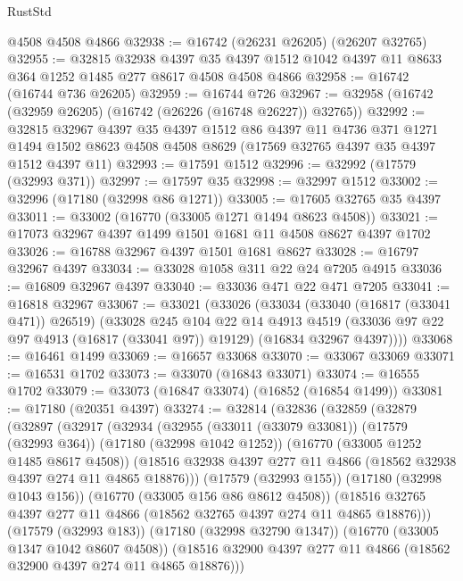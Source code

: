 \begin{lexlean}{RustStd}
\begin{coremodule}
    @4508
    @4508
    @4866
@32938 := @16742 (@26231 @26205) (@26207 @32765)
@32955 := @32815
    @32938
    @4397
    @35
    @4397
    @1512
    @1042
    @4397
    @11
    @8633
    @364
    @1252
    @1485
    @277
    @8617
    @4508
    @4508
    @4866
@32958 := @16742 (@16744 @736 @26205)
@32959 := @16744 @726
@32967 := @32958 (@16742 (@32959 @26205) (@16742 (@26226 (@16748 @26227)) @32765))
@32992 := @32815
    @32967
    @4397
    @35
    @4397
    @1512
    @86
    @4397
    @11
    @4736
    @371
    @1271
    @1494
    @1502
    @8623
    @4508
    @4508
    @8629
    (@17569 @32765 @4397 @35 @4397 @1512 @4397 @11)
@32993 := @17591 @1512
@32996 := @32992 (@17579 (@32993 @371))
@32997 := @17597 @35
@32998 := @32997 @1512
@33002 := @32996 (@17180 (@32998 @86 @1271))
@33005 := @17605 @32765 @35 @4397
@33011 := @33002 (@16770 (@33005 @1271 @1494 @8623 @4508))
@33021 := @17073 @32967 @4397 @1499 @1501 @1681 @11 @4508 @8627 @4397 @1702
@33026 := @16788 @32967 @4397 @1501 @1681 @8627
@33028 := @16797 @32967 @4397
@33034 := @33028 @1058 @311 @22 @24 @7205 @4915
@33036 := @16809 @32967 @4397
@33040 := @33036 @471 @22 @471 @7205
@33041 := @16818 @32967
@33067 := @33021
    (@33026
      (@33034
        (@33040 (@16817 (@33041 @471)) @26519)
        (@33028
          @245
          @104
          @22
          @14
          @4913
          @4519
          (@33036 @97 @22 @97 @4913 (@16817 (@33041 @97)) @19129)
          (@16834 @32967 @4397))))
@33068 := @16461 @1499
@33069 := @16657 @33068
@33070 := @33067 @33069
@33071 := @16531 @1702
@33073 := @33070 (@16843 @33071)
@33074 := @16555 @1702
@33079 := @33073 (@16847 @33074) (@16852 (@16854 @1499))
@33081 := @17180 (@20351 @4397)
@33274 := @32814
    (@32836
      (@32859
        (@32879
          (@32897
            (@32917
              (@32934
                (@32955
                  (@33011 (@33079 @33081))
                  (@17579 (@32993 @364))
                  (@17180 (@32998 @1042 @1252))
                  (@16770 (@33005 @1252 @1485 @8617 @4508))
                  (@18516 @32938 @4397 @277 @11 @4866 (@18562 @32938 @4397 @274 @11 @4865 @18876)))
                (@17579 (@32993 @155))
                (@17180 (@32998 @1043 @156))
                (@16770 (@33005 @156 @86 @8612 @4508))
                (@18516 @32765 @4397 @277 @11 @4866 (@18562 @32765 @4397 @274 @11 @4865 @18876)))
              (@17579 (@32993 @183))
              (@17180 (@32998 @32790 @1347))
              (@16770 (@33005 @1347 @1042 @8607 @4508))
              (@18516 @32900 @4397 @277 @11 @4866 (@18562 @32900 @4397 @274 @11 @4865 @18876)))

\end{coremodule}
\end{lexlean}
